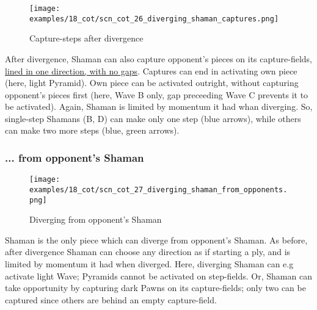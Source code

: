 \clearpage %

\vspace*{-2.7\baselineskip}
\noindent
\begin{figure}[!h]
\texttt{[image: examples/18\_cot/scn\_cot\_26\_diverging\_shaman\_captures.png]}
\vspace*{-1.4\baselineskip}
\caption{Capture-steps after divergence}
\label{fig:scn_cot_26_diverging_shaman_captures}
\end{figure}

\vspace*{-0.6\baselineskip}
After divergence, Shaman can also capture opponent's pieces on its capture-fields,
\hyperref[fig:scn_cot_03_light_shaman_capture_ply]{lined in one direction, with no gaps}.
Captures can end in activating own piece (here, light Pyramid). Own piece can
be activated outright, without capturing opponent's pieces first (here, Wave B only, gap
preceeding Wave C prevents it to be activated). \newline
\indent
Again, Shaman is limited by momentum it had whan diverging. So, single-step Shamans
(B, D) can make only one step (blue arrows), while others can make two more steps
(blue, green arrows).

\clearpage %

\subsubsection*{... from opponent's Shaman}
\label{sec:Conquest of Tlalocan/Divergence/... from opponent's Shaman}

\vspace*{-1.4\baselineskip}
\noindent
\begin{figure}[!h]
\texttt{[image: examples/18\_cot/scn\_cot\_27\_diverging\_shaman\_from\_opponents.png]}
\vspace*{-1.3\baselineskip}
\caption{Diverging from opponent's Shaman}
\label{fig:scn_cot_27_diverging_shaman_from_opponents}
\end{figure}

\vspace*{-0.5\baselineskip}
Shaman is the only piece which can diverge from opponent's Shaman. As before, after
divergence Shaman can choose any direction as if starting a ply, and is limited by
momentum it had when diverged. %
Here, diverging Shaman can e.g activate light Wave; Pyramids cannot be activated
on step-fields. Or, Shaman can take opportunity by capturing dark Pawns on its
capture-fields; only two can be captured since others are behind an empty
capture-field.

